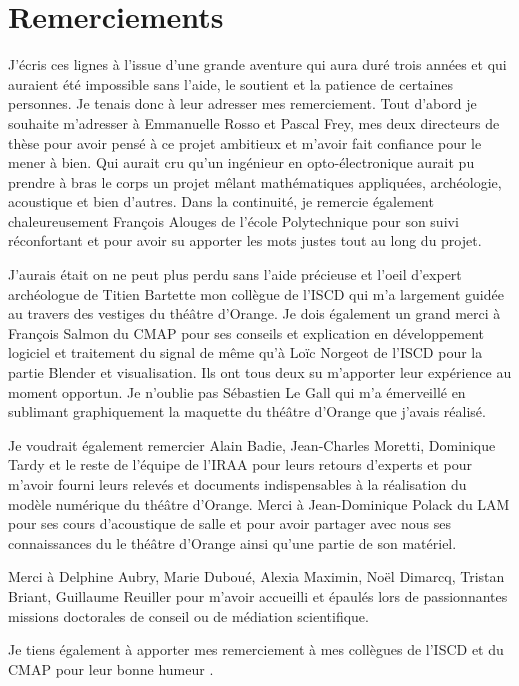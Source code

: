 \chapter*{Remerciements}

J'écris ces lignes à l'issue d'une grande aventure qui aura duré trois années et qui auraient été impossible sans l'aide, le soutient et la patience de certaines personnes. Je tenais donc à leur adresser mes remerciement. Tout d'abord je souhaite m'adresser à Emmanuelle Rosso et Pascal Frey, mes deux directeurs de thèse pour avoir pensé à ce projet ambitieux et m'avoir fait confiance pour le mener à bien. Qui aurait cru qu'un ingénieur en opto-électronique aurait pu prendre à bras le corps un projet mêlant mathématiques appliquées, archéologie, acoustique et bien d'autres. Dans la continuité, je remercie également chaleureusement François Alouges de l'école Polytechnique pour son suivi réconfortant et pour avoir su apporter les mots justes tout au long du projet. 

J'aurais était on ne peut plus perdu sans l'aide précieuse et l'oeil d'expert archéologue de Titien Bartette mon collègue de l'ISCD qui m'a largement guidée au travers des vestiges du théâtre d'Orange. Je dois également un grand merci à François Salmon du CMAP pour ses conseils et explication en développement logiciel et traitement du signal de même qu'à Loïc Norgeot de l'ISCD pour la partie Blender et visualisation. Ils ont tous deux su m'apporter leur expérience au moment opportun. Je n'oublie pas Sébastien Le Gall qui m'a émerveillé en sublimant graphiquement la maquette du théâtre d'Orange que j'avais réalisé. 

Je voudrait également remercier Alain Badie, Jean-Charles Moretti, Dominique Tardy et le reste de l'équipe de l'IRAA pour leurs retours d'experts et pour m'avoir fourni leurs relevés et documents indispensables à la réalisation du modèle numérique du théâtre d'Orange. Merci à Jean-Dominique Polack du LAM pour ses cours d'acoustique de salle et pour avoir partager avec nous ses connaissances du le théâtre d'Orange ainsi qu'une partie de son matériel.

Merci à Delphine Aubry, Marie Duboué, Alexia Maximin, Noël Dimarcq, Tristan Briant, Guillaume Reuiller pour m'avoir accueilli et épaulés lors de passionnantes missions doctorales de conseil ou de médiation scientifique.

Je tiens également à apporter mes remerciement à mes collègues de l'ISCD et du CMAP pour leur bonne humeur .

